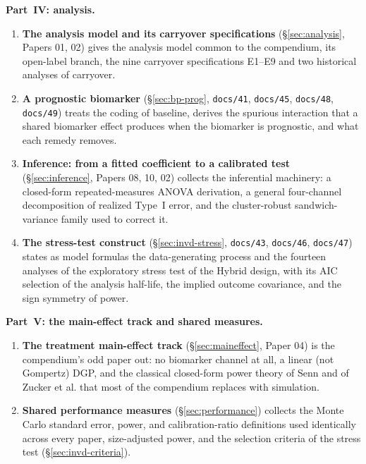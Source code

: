 \documentclass[11pt]{article}
\newcommand{\code}[1]{\texttt{#1}}
\begin{document}
\noindent\textbf{Part~IV: analysis.}
\begin{enumerate}[label=\textbf{\arabic*.}, itemsep=2pt, resume]
\item \textbf{The analysis model and its carryover specifications}
  (\S\ref{sec:analysis}, Papers 01, 02) gives the analysis model common
  to the compendium, its open-label branch, the nine carryover
  specifications E1--E9 and two historical analyses of carryover.
\item \textbf{A prognostic biomarker} (\S\ref{sec:bp-prog},
  \code{docs/41}, \code{docs/45}, \code{docs/48}, \code{docs/49})
  treats the coding of baseline, derives the spurious interaction that
  a shared biomarker effect produces when the biomarker is prognostic,
  and what each remedy removes.
\item \textbf{Inference: from a fitted coefficient to a calibrated
  test} (\S\ref{sec:inference}, Papers 08, 10, 02) collects the
  inferential machinery: a closed-form repeated-measures ANOVA
  derivation, a general four-channel decomposition of realized
  Type~I error, and the cluster-robust sandwich-variance family used
  to correct it.
\item \textbf{The stress-test construct} (\S\ref{sec:invd-stress},
  \code{docs/43}, \code{docs/46}, \code{docs/47}) states as model
  formulas the data-generating process and the fourteen analyses of
  the exploratory stress test of the Hybrid design, with its AIC
  selection of the analysis half-life, the implied outcome covariance,
  and the sign symmetry of power.
\end{enumerate}

\noindent\textbf{Part~V: the main-effect track and shared measures.}
\begin{enumerate}[label=\textbf{\arabic*.}, itemsep=2pt, resume]
\item \textbf{The treatment main-effect track}
  (\S\ref{sec:maineffect}, Paper 04) is the compendium's odd paper
  out: no biomarker channel at all, a linear (not Gompertz) DGP, and
  the classical closed-form power theory of Senn and of Zucker et al.
  that most of the compendium replaces with simulation.
\item \textbf{Shared performance measures}
  (\S\ref{sec:performance}) collects the Monte Carlo standard error,
  power, and calibration-ratio definitions used identically across
  every paper, size-adjusted power, and the selection criteria of the
  stress test (\S\ref{sec:invd-criteria}).
\end{enumerate}
\end{document}
